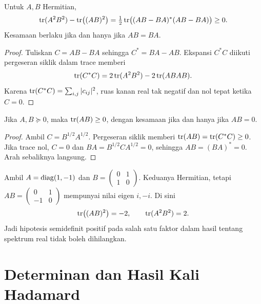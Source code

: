 \begin{teorema}
    Untuk $A,B$ Hermitian,
    \[
        \operatorname{tr}(A^2B^2)-\operatorname{tr}\bigl((AB)^2\bigr)
        =\tfrac12\operatorname{tr}\bigl((AB-BA)^*(AB-BA)\bigr)\ge0.
    \]
    Kesamaan berlaku jika dan hanya jika $AB=BA$.
\end{teorema}
\begin{proof}
    Tuliskan $C=AB-BA$ sehingga $C^*=BA-AB$.
    Ekspansi $C^*C$ diikuti pergeseran siklik dalam trace memberi
    \[
        \operatorname{tr}(C^*C)=2\operatorname{tr}(A^2B^2)-2\operatorname{tr}(ABAB).
    \]
    Karena $\operatorname{tr}(C^*C)=\sum_{i,j}|c_{ij}|^2$, ruas kanan real
    tak negatif dan nol tepat ketika $C=0$.
\end{proof}

\begin{prop}
    \label{khusus:trace-positif}
    Jika $A,B\succeq0$, maka $\operatorname{tr}(AB)\ge0$, dengan kesamaan
    jika dan hanya jika $AB=0$.
\end{prop}
\begin{proof}
    Ambil $C=B^{1/2}A^{1/2}$. Pergeseran siklik memberi
    $\operatorname{tr}(AB)=\operatorname{tr}(C^*C)\ge0$. Jika trace nol, $C=0$ dan
    $BA=B^{1/2}CA^{1/2}=0$, sehingga $AB=(BA)^*=0$.
    Arah sebaliknya langsung.
\end{proof}

\begin{exam}
    Ambil $A=\operatorname{diag}(1,-1)$ dan
    $B=\begin{pmatrix}0&1\\1&0\end{pmatrix}$.
    Keduanya Hermitian, tetapi
    $AB=\begin{pmatrix}0&1\\-1&0\end{pmatrix}$ mempunyai nilai eigen
    $i,-i$. Di sini
    \[
        \operatorname{tr}\bigl((AB)^2\bigr)=-2,\qquad \operatorname{tr}(A^2B^2)=2.
    \]
    Jadi hipotesis semidefinit positif pada salah satu faktor
    dalam hasil tentang spektrum real tidak boleh dihilangkan.
\end{exam}

\section{Determinan dan Hasil Kali Hadamard}
\label{khusus:hadamard}

